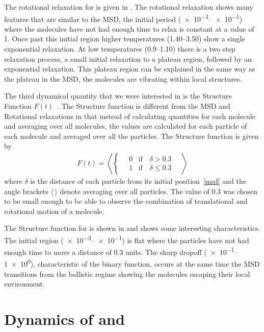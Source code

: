 The rotational relaxation for \done is given in . The rotational relaxation shows many features that are similar to the MSD, the initial period (\numrange{e-3}{e-1}) where the molecules have not had enough time to relax is constant at a value of \num{1}. Once past this initial region higher temperatures (\numrange{1.40}{3.50}) show a single exponential relaxation. At low temperatures (\numrange{0.9}{1.10}) there is a two step relaxation process, a small initial relaxation to a plateau region, followed by an exponential relaxation. This plateau region can be explained in the same way as the plateau in the MSD, the molecules are vibrating within local structures.

The third dynamical quantity that we were interested in is the Structure Function $F(t)$~. The Structure function is different from the MSD and Rotational relaxations in that instead of calculating quantities for each molecule and averaging over all molecules, the values are calculated for each particle of each molecule and averaged over all the particles. The Structure function is given by
\begin{align}
    F(t) = \left \langle \begin{cases}
        \quad0 &\text{if}\quad \delta > 0.3 \\
        \quad1 &\text{if}\quad \delta \leq 0.3
    \end{cases} \quad \right \rangle
    \label{eq:struct}
\end{align}
where $\delta$ is the distance of each particle from its initial position~\eqref{msd} and the angle brackets $\langle\,\rangle$ denote averaging over all particles. The value of \num{0.3} was chosen to be small enough to be able to observe the combination of translational and rotational motion of a molecule.

The Structure function for \done is shown in  and shows some interesting characteristics. The initial region (\numrange{e-3}{e-1}) is flat where the particles have not had enough time to move a distance of \num{0.3} units. The sharp dropoff (\numrange{e-1}{1e0}), characteristic of the binary function, occurs at the same time the MSD transitions from the ballistic regime showing the molecules escaping their local environment.

\section{Dynamics of \dcon and \tri}

